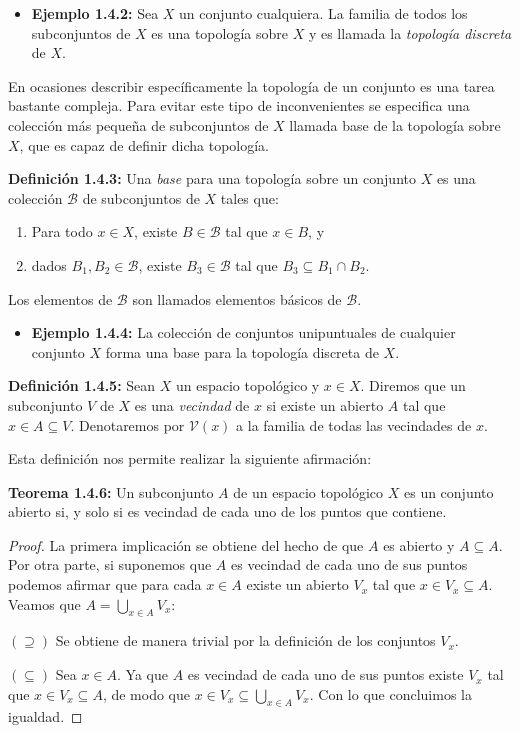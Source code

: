 \begin{itemize}
    \item \textbf{Ejemplo 1.4.2:} Sea $X$ un conjunto cualquiera. La familia de todos los subconjuntos de $X$ es una topología sobre $X$ y es llamada la \textit{topología discreta} de $X$.
\end{itemize}

En ocasiones describir específicamente la topología de un conjunto es una tarea bastante compleja. Para evitar este tipo de inconvenientes se especifica una colección más pequeña de subconjuntos de $X$ llamada base de la topología sobre $X$, que es capaz de definir dicha topología. 

\textbf{Definición 1.4.3:} Una \textit{base} para una topología sobre un conjunto $X$ es una colección $\mathcal{B}$ de subconjuntos de $X$ tales que:
\begin{enumerate}
    \item Para todo $x\in X$, existe $B\in\mathcal{B}$ tal que $x\in B$, y
    \item dados $B_1,B_2\in\mathcal{B}$, existe $B_3\in\mathcal{B}$ tal que $B_3\subseteq B_1\cap B_2$.
\end{enumerate}
Los elementos de $\mathcal{B}$ son llamados elementos básicos de $\mathcal{B}$.

\begin{itemize}
    \item \textbf{Ejemplo 1.4.4:} La colección de conjuntos unipuntuales de cualquier conjunto $X$ forma una base para la topología discreta de $X$.
\end{itemize}

\textbf{Definición 1.4.5:} Sean $X$ un espacio topológico y $x\in X$. Diremos que un subconjunto $V$ de $X$ es una \textit{vecindad} de $x$ si existe un abierto $A$ tal que $x\in A\subseteq V$. Denotaremos por $\mathcal{V}(x)$ a la familia de todas las vecindades de $x$.

Esta definición nos permite realizar la siguiente afirmación:

\textbf{Teorema 1.4.6:} Un subconjunto $A$ de un espacio topológico $X$ es un conjunto abierto si, y solo si es vecindad de cada uno de los puntos que contiene.

\begin{proof}
La primera implicación se obtiene del hecho de que $A$ es abierto y $A\subseteq A$. Por otra parte, si suponemos que $A$ es vecindad de cada uno de sus puntos podemos afirmar que para cada $x\in A$ existe un abierto $V_x$ tal que $x\in V_x\subseteq A$. Veamos que $A=\bigcup_{x\in A}V_x$:

$(\supseteq)$ Se obtiene de manera trivial por la definición de los conjuntos $V_x$.

$(\subseteq)$ Sea $x\in A$. Ya que $A$ es vecindad de cada uno de sus puntos existe $V_x$ tal que $x\in V_x\subseteq A$, de modo que $x\in V_x\subseteq\bigcup_{x\in A}V_x$. Con lo que concluimos la igualdad.
\end{proof}

